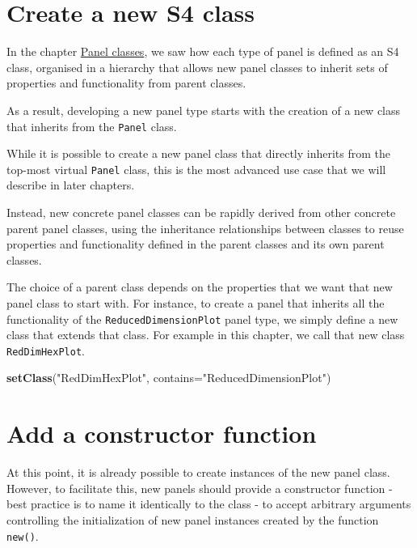 \documentclass[]{book}
\newenvironment{Shaded}{\begin{snugshade}}{\end{snugshade}}
\newcommand{\KeywordTok}[1]{\textcolor[rgb]{0.13,0.29,0.53}{\textbf{#1}}}
\newcommand{\DataTypeTok}[1]{\textcolor[rgb]{0.13,0.29,0.53}{#1}}
\newcommand{\StringTok}[1]{\textcolor[rgb]{0.31,0.60,0.02}{#1}}
\newcommand{\NormalTok}[1]{#1}
\begin{document}
\section{Create a new S4 class}\label{create-a-new-s4-class}

In the chapter \protect\hyperlink{panels}{Panel classes}, we saw how
each type of panel is defined as an S4 class, organised in a hierarchy
that allows new panel classes to inherit sets of properties and
functionality from parent classes.

As a result, developing a new panel type starts with the creation of a
new class that inherits from the \texttt{Panel} class.

While it is possible to create a new panel class that directly inherits
from the top-most virtual \texttt{Panel} class, this is the most
advanced use case that we will describe in later chapters.

Instead, new concrete panel classes can be rapidly derived from other
concrete parent panel classes, using the inheritance relationships
between classes to reuse properties and functionality defined in the
parent classes and its own parent classes.

The choice of a parent class depends on the properties that we want that
new panel class to start with. For instance, to create a panel that
inherits all the functionality of the \texttt{ReducedDimensionPlot}
panel type, we simply define a new class that extends that class. For
example in this chapter, we call that new class \texttt{RedDimHexPlot}.

\begin{Shaded}
\begin{Highlighting}[]
\KeywordTok{setClass}\NormalTok{(}\StringTok{"RedDimHexPlot"}\NormalTok{, }\DataTypeTok{contains=}\StringTok{"ReducedDimensionPlot"}\NormalTok{)}
\end{Highlighting}
\end{Shaded}

\section{Add a constructor function}\label{add-a-constructor-function}

At this point, it is already possible to create instances of the new
panel class. However, to facilitate this, new panels should provide a
constructor function - best practice is to name it identically to the
class - to accept arbitrary arguments controlling the initialization of
new panel instances created by the function \texttt{new()}.
\end{document}
